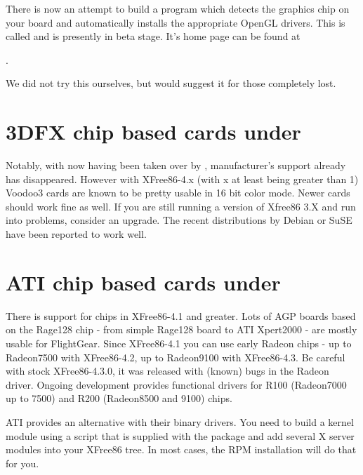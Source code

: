 There is now an attempt to build a program which detects the graphics chip on your board
and automatically installs the appropriate OpenGL drivers. This is called  and is presently in beta stage. It's home page can be found at
\medskip

.
\medskip

We did not try this ourselves, but would suggest it for those completely lost.

\section{3DFX chip based cards under \label{3dfxlinux}}

Notably, with  now having been taken over by ,
manufacturer's support already has disappeared. However with XFree86-4.x
(with x at least being greater than 1) Voodoo3 cards are known to be pretty
usable in 16 bit color mode. Newer cards should work fine as well. If you
are still running a version of Xfree86 3.X and run into problems, consider
an upgrade. The recent distributions by Debian or SuSE have been reported to
work well.

\section{ATI chip based cards under \label{atilinux}}

There is support for  chips in XFree86-4.1 and greater. Lots of
AGP boards based on the Rage128 chip - from simple Rage128 board to ATI
Xpert2000 - are mostly usable for FlightGear. Since XFree86-4.1 you can use
early Radeon chips - up to Radeon7500 with XFree86-4.2, up to Radeon9100
with XFree86-4.3.
Be careful with stock XFree86-4.3.0, it was released with (known) bugs in
the Radeon driver. Ongoing development provides functional drivers for R100
(Radeon7000 up to 7500) and R200 (Radeon8500 and 9100) chips.

ATI provides an alternative with their binary drivers. You need to build a
kernel module using a script that is supplied with the package and add
several X server modules into your XFree86 tree. In most cases, the RPM
installation will do that for you.

